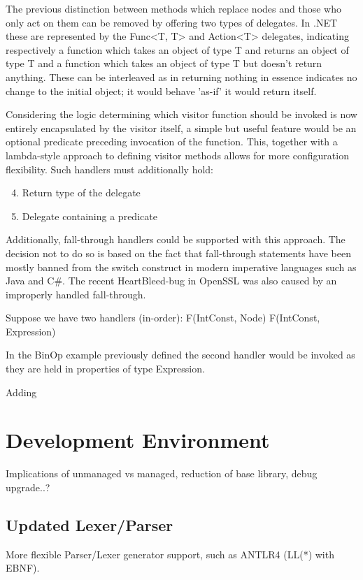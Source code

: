 \documentclass[twoside,openright]{uva-bachelor-thesis}
\newcommand{\includecode}[2]{}
\begin{document}
			The previous distinction between methods which replace nodes and those who only act on them can be removed by offering two types of delegates. In .NET these are represented by the Func<T, T> and Action<T>  delegates, indicating respectively a function which takes an object of type T and returns an object of type T and a function which takes an object of type T but doesn't return anything. These can be interleaved as in returning nothing in essence indicates no change to the initial object; it would behave 'as-if' it would return itself.
			
			Considering the logic determining which visitor function should be invoked is now entirely encapsulated by the visitor itself, a simple but useful feature would be an optional predicate preceding invocation of the function. This, together with a lambda-style approach to defining visitor methods allows for more configuration flexibility. Such handlers must additionally hold:
			\begin{enumerate}
				\setcounter{enumi}{3}
				\item Return type of the delegate
				\item Delegate containing a predicate
			\end{enumerate}
			
			\includecode{Test}{report.bib}
			
			Additionally, fall-through handlers could be supported with this approach. The decision not to do so is based on the fact that fall-through statements have been mostly banned from the switch construct in modern imperative languages such as Java and C\#. The recent HeartBleed-bug in OpenSSL was also caused by an improperly handled fall-through.
			
			Suppose we have two handlers (in-order):
			F(IntConst, Node)
			F(IntConst, Expression)
			
			In the BinOp example previously defined the second handler would be invoked as they are held in properties of type Expression. 
			
			Adding 
			
	\section{Development Environment}
		Implications of unmanaged vs managed, reduction of base library, debug upgrade..?
		
		\subsection{Updated Lexer/Parser}
			More flexible Parser/Lexer generator support, such as ANTLR4 (LL(*) with EBNF).
			
\end{document}
